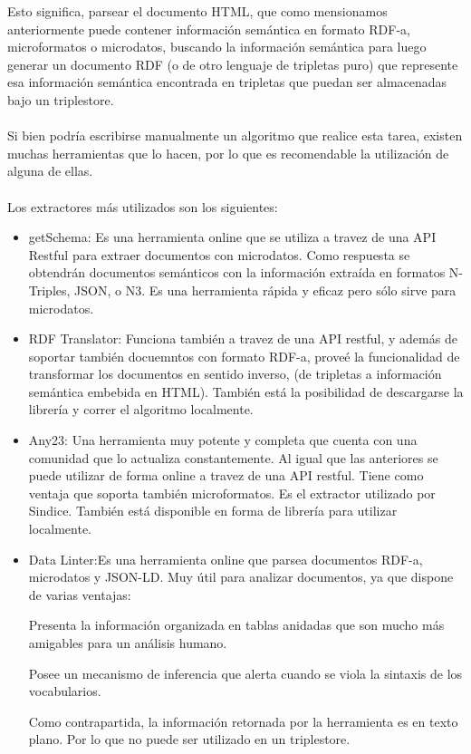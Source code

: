 Esto significa, parsear el documento HTML, que como mensionamos anteriormente puede contener información semántica en formato RDF-a, microformatos o microdatos, buscando 
la información semántica para luego generar un documento RDF (o de otro lenguaje de tripletas puro) que represente esa información semántica encontrada en tripletas que puedan ser almacenadas bajo un triplestore.
\\\\
Si bien podría escribirse manualmente un algoritmo que realice esta tarea, existen muchas herramientas que lo hacen, por lo que es recomendable la utilización de alguna de ellas.
\\\\
Los extractores más utilizados son los siguientes:
\begin{itemize}
\item getSchema: Es una herramienta online que se utiliza a travez de una API Restful para extraer documentos con microdatos. Como respuesta se obtendrán documentos semánticos 
con la información extraída en formatos N-Triples, JSON, o N3. 
Es una herramienta rápida y eficaz pero sólo sirve para microdatos.

\item RDF Translator: Funciona también a travez de una API restful, y además de soportar también docuemntos con formato RDF-a, proveé la funcionalidad de transformar los documentos en sentido inverso, 
(de tripletas a información semántica embebida en HTML). 
También está la posibilidad de descargarse la librería y correr el algoritmo localmente.

\item Any23: Una herramienta muy potente y completa que cuenta con una comunidad que lo actualiza constantemente. Al igual que las anteriores se puede utilizar de forma online a travez 
de una API restful. Tiene como ventaja que soporta también microformatos. Es el extractor utilizado por Sindice. 
También está disponible en forma de librería para utilizar localmente.

\item Data Linter:Es una herramienta online que parsea documentos RDF-a, microdatos y JSON-LD.  
Muy útil para analizar documentos, ya que dispone de varias ventajas: 

Presenta la información organizada en tablas anidadas que son mucho más amigables para un análisis humano. 

Posee un mecanismo de inferencia que alerta cuando se viola la sintaxis de los vocabularios.

Como contrapartida, la información retornada por la herramienta es en texto plano. Por lo que no puede ser utilizado en un triplestore.

\end{itemize}

